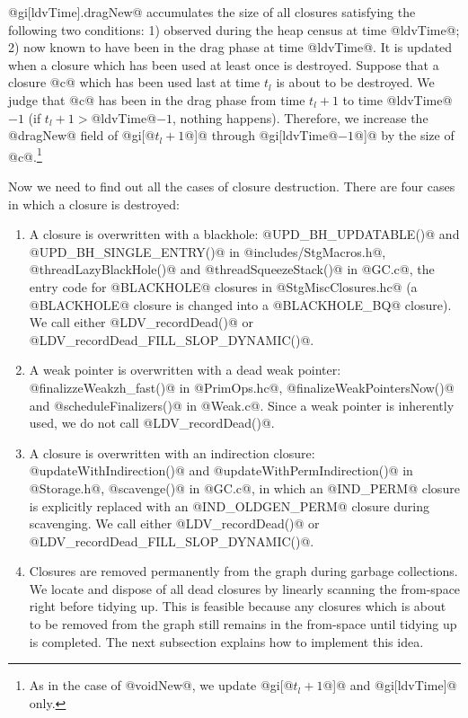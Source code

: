 \documentclass{article}
\begin{document}
@gi[ldvTime].dragNew@ accumulates the size of all closures satisfying the following
two conditions: 1) observed during the heap census at time @ldvTime@;
2) now known to have been in the drag phase at time @ldvTime@.
It is updated when a closure which has been used at least once is destroyed.
Suppose that a closure @c@ which has been used last at time $t_l$ is about to
be destroyed.
We judge that @c@ has been in the drag phase from time $t_l + 1$ to 
time @ldvTime@$ - 1$ (if $t_l + 1 > $@ldvTime@$ - 1$, nothing happens).
Therefore, we increase the @dragNew@ field of @gi[@$t_l + 1$@]@ through 
@gi[ldvTime@$ - 1$@]@
by the size of @c@.\footnote{As in the case of @voidNew@, we update
@gi[@$t_l + 1$@]@ and @gi[ldvTime]@ only.}

Now we need to find out all the cases of closure destruction.
There are four cases in which a closure is destroyed:

\begin{enumerate}
\item A closure is overwritten with a blackhole: 
  @UPD_BH_UPDATABLE()@ and @UPD_BH_SINGLE_ENTRY()@ in @includes/StgMacros.h@,
  @threadLazyBlackHole()@ and @threadSqueezeStack()@ in @GC.c@,
  the entry code for @BLACKHOLE@ closures in @StgMiscClosures.hc@ (a 
  @BLACKHOLE@ closure is changed into a @BLACKHOLE_BQ@ closure).
  We call either @LDV_recordDead()@ or @LDV_recordDead_FILL_SLOP_DYNAMIC()@.

\item A weak pointer is overwritten with a dead weak pointer:
  @finalizzeWeakzh_fast()@ in @PrimOps.hc@, 
  @finalizeWeakPointersNow()@ and @scheduleFinalizers()@ in @Weak.c@.
  Since a weak pointer is inherently used, we do not call @LDV_recordDead()@.

\item A closure is overwritten with an indirection closure:
  @updateWithIndirection()@ and @updateWithPermIndirection()@ in @Storage.h@,
  @scavenge()@ in @GC.c@, in which an @IND_PERM@ closure is explicitly replaced
  with an @IND_OLDGEN_PERM@ closure during scavenging.
  We call either @LDV_recordDead()@ or @LDV_recordDead_FILL_SLOP_DYNAMIC()@.
  
\item Closures are removed permanently from the graph during garbage collections.
We locate and dispose of all dead closures by 
linearly scanning the from-space right before tidying up.
This is feasible because any closures which is about to be removed from the graph
still remains in the from-space until tidying up is completed.
The next subsection explains how to implement this idea.
\end{enumerate}
\end{document}
